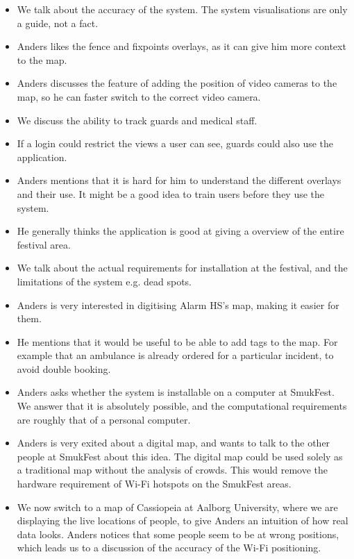 \begin{itemize}
    \item We talk about the accuracy of the system. The system visualisations are only a guide, not a fact.
    \item Anders likes the fence and fixpoints overlays, as it can give him more context to the map.
    \item Anders discusses the feature of adding the position of video cameras to the map, so he can faster switch to the correct video camera.
    \item We discuss the ability to track guards and medical staff.
    \item If a login could restrict the views a user can see, guards could also use the application.
    \item Anders mentions that it is hard for him to understand the different overlays and their use. It might be a good idea to train users before they use the system.
    \item He generally thinks the application is good at giving a overview of the entire festival area.
    \item We talk about the actual requirements for installation at the festival, and the limitations of the system e.g. dead spots.
    \item Anders is very interested in digitising Alarm HS's map, making it easier for them.
    \item He mentions that it would be useful to be able to add tags to the map. For example that an ambulance is already ordered for a particular incident, to avoid double booking.
    \item Anders asks whether the system is installable on a computer at SmukFest. We answer that it is absolutely possible, and the computational requirements are roughly that of a personal computer.
    \item Anders is very exited about a digital map, and wants to talk to the other people at SmukFest about this idea. The digital map could be used solely as a traditional map without the analysis of crowds. This would remove the hardware requirement of Wi-Fi hotspots on the SmukFest areas.
    \item We now switch to a map of Cassiopeia at Aalborg University, where we are displaying the live locations of people, to give Anders an intuition of how real data looks. Anders notices that some people seem to be at wrong positions, which leads us to a discussion of the accuracy of the Wi-Fi positioning.
\end{itemize}